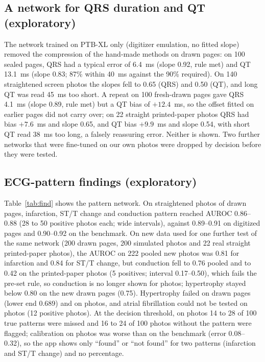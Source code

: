 \documentclass[conference]{IEEEtran}
\begin{document}
\subsection{A network for QRS duration and QT (exploratory)}
The network trained on PTB-XL only (digitizer emulation, no fitted slope) removed the compression of the hand-made methods on drawn pages: on 100 sealed pages, QRS had a typical error of 6.4~ms (slope 0.92, rule met) and QT 13.1~ms (slope 0.83; 87\% within 40~ms against the 90\% required). On 140 straightened screen photos the slopes fell to 0.65 (QRS) and 0.50 (QT), and long QT was read 45~ms too short. A repeat on 100 fresh-drawn pages gave QRS 4.1~ms (slope 0.89, rule met) but a QT bias of $+12.4$~ms, so the offset fitted on earlier pages did not carry over; on 22 straight printed-paper photos QRS had bias $+7.6$~ms and slope 0.65, and QT bias $+9.9$~ms and slope 0.54, with short QT read 38~ms too long, a falsely reassuring error. Neither is shown. Two further networks that were fine-tuned on our own photos were dropped by decision before they were tested.

\subsection{ECG-pattern findings (exploratory)}
Table~\ref{tab:find} shows the pattern network. On straightened photos of drawn pages, infarction, ST/T change and conduction pattern reached AUROC 0.86--0.88 (28 to 50 positive photos each; wide intervals), against 0.89--0.91 on digitized pages and 0.90--0.92 on the benchmark. On new data used for one further test of the same network (200 drawn pages, 200 simulated photos and 22 real straight printed-paper photos), the AUROC on 222 pooled new photos was 0.81 for infarction and 0.84 for ST/T change, but conduction fell to 0.76 pooled and to 0.42 on the printed-paper photos (5 positives; interval 0.17--0.50), which fails the pre-set rule, so conduction is no longer shown for photos; hypertrophy stayed below 0.80 on the new drawn pages (0.75).  Hypertrophy failed on drawn pages (lower end 0.689) and on photos, and atrial fibrillation could not be tested on photos (12 positive photos). At the decision threshold, on photos 14 to 28 of 100 true patterns were missed and 16 to 24 of 100 photos without the pattern were flagged; calibration on photos was worse than on the benchmark (error 0.08--0.32), so the app shows only ``found'' or ``not found'' for two patterns (infarction and ST/T change) and no percentage.
\end{document}
